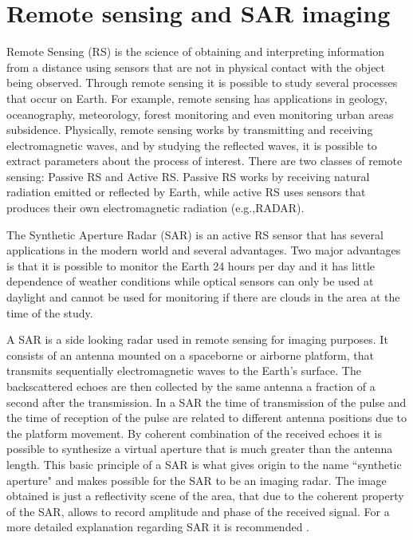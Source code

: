 
\label{chap:second}
\ifpdf
    \graphicspath{{Chapter1/Figures/PNG/}{Chapter1/Figures/PDF/}{Chapter1/Figures/}}
\else
    \graphicspath{{Chapter1/Figures/EPS/}{Chapter1/Figures/}}
\fi



\section{Remote sensing and SAR imaging}
\label{sec:sar_image_formation}
Remote Sensing (RS) is the science of obtaining and interpreting information from a distance using sensors that are not in physical contact with the object being observed. Through remote sensing it is possible to study several processes that occur on Earth. For example, remote sensing has applications in geology, oceanography, meteorology, forest monitoring and even monitoring urban areas subsidence. Physically, remote sensing works by transmitting and receiving electromagnetic waves, and by studying the reflected waves, it is possible to extract parameters about the process of interest.
There are two classes of remote sensing: Passive RS and Active RS. Passive RS works by receiving natural radiation emitted or reflected by Earth, while active RS uses sensors that produces their own electromagnetic radiation (e.g.,RADAR).

The Synthetic Aperture Radar (SAR) is an active RS sensor that has several applications in the modern world and several advantages. Two major advantages is that it is possible to monitor the Earth 24 hours per day and it has little dependence of weather conditions while optical sensors can only be used at daylight and cannot be used for monitoring if there are clouds in the area at the time of the study.

A SAR is a side looking radar used in remote sensing for imaging purposes. 
It consists of an antenna mounted on a spaceborne or airborne platform, that transmits sequentially electromagnetic waves to the Earth's surface. The backscattered echoes are then collected by the same antenna a fraction of a second after the transmission. In a SAR the time of transmission of the pulse and the time of reception of the pulse are related to different antenna positions due to the platform movement. By coherent combination of the received echoes it is possible to synthesize a virtual aperture that is much greater than the antenna length. This basic principle of a SAR is what gives origin to the name ``synthetic aperture" and makes possible for the SAR to be an imaging radar. The image obtained is just a reflectivity scene of the area, that due to the coherent property of the SAR, allows to record amplitude and phase of the received signal. For a more detailed explanation regarding SAR it is recommended \cite{livro}.

